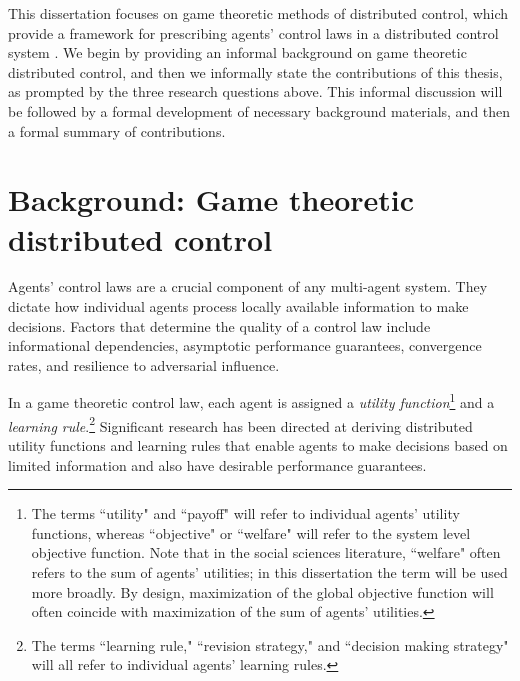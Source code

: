 This dissertation focuses on game theoretic methods of distributed control, which provide a framework for prescribing agents' control laws in a distributed control system \cite{Marden2008, Zhu2009, Goto2010, Staudigl2012, Fox2010, Lasaulce2011, Alpcan2010, Han2012, MacKenzie2006, Menache2011}. We begin by providing an informal background on game theoretic distributed control, and then we informally state the contributions of this thesis, as prompted by the three research questions above. This informal discussion will be followed by a formal development of necessary background materials, and then a formal summary of  contributions. 


\section{Background: Game theoretic distributed control}

Agents' control laws are a crucial component of any multi-agent system. They dictate how individual agents process locally available information to make decisions. Factors that determine the quality of a control law include informational dependencies, asymptotic performance guarantees, convergence rates, and resilience to adversarial influence.

In a game theoretic control law, each agent is assigned a {\it utility function}\footnote{The terms ``utility" and ``payoff" will refer to individual agents' utility functions, whereas ``objective" or ``welfare" will refer to the system level objective function. Note that in the social sciences literature, ``welfare" often refers to the sum of agents' utilities; in this dissertation the term will be used more broadly. By design, maximization of the global objective function will often coincide with maximization of the sum of agents' utilities. } and a {\it learning rule}.\footnote{The terms ``learning rule," ``revision strategy," and ``decision making strategy" will all refer to individual agents' learning rules.} Significant research has been directed at deriving distributed utility functions and learning rules that enable agents to make decisions based on limited information and also have desirable performance guarantees.


